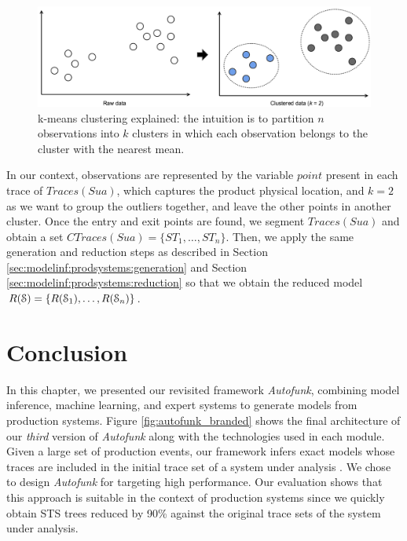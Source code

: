 \begin{figure}[ht]
    \begin{center}
        \includegraphics[width=1.0\linewidth]{figures/kmeans.png}
    \end{center}

    \caption{k-means clustering explained: the intuition is to
    partition $n$ observations into $k$ clusters in which each
    observation belongs to the cluster with the nearest mean.}
    \label{fig:kmeans}
\end{figure}

In our context, observations are represented by the variable
$point$ present in each trace of $Traces({Sua})$, which captures
the product physical location, and $k=2$ as we want to group the
outliers together, and leave the other points in another cluster.
Once the entry and exit points are found, we segment
$Traces({Sua})$ and obtain a set $CTraces({Sua})=\{ST_1, \dots,
ST_n\}$. Then, we apply the same generation and reduction steps
as described in Section \ref{sec:modelinf:prodsystems:generation}
and Section \ref{sec:modelinf:prodsystems:reduction} so that we
obtain the reduced model $R(\EuScript{S}) =
\{R(\EuScript{S}_1),\dots,R(\EuScript{S}_n)\}$.


\section{Conclusion}
\label{sec:modelinf:prodsystems:conclusion}

In this chapter, we presented our revisited framework
\textit{Autofunk}, combining model inference, machine learning,
and expert systems to generate models from production systems.
Figure \ref{fig:autofunk_branded} shows the final architecture of
our \emph{third} version of \textit{Autofunk} along with the
technologies used in each module. Given a large set of production
events, our framework infers exact models whose traces are
included in the initial trace set of a system under analysis
\cite{petrenko06}.  We chose to design \textit{Autofunk} for
targeting high performance. Our evaluation shows that this
approach is suitable in the context of production systems since
we quickly obtain STS trees reduced by 90\% against the original
trace sets of the system under analysis.

